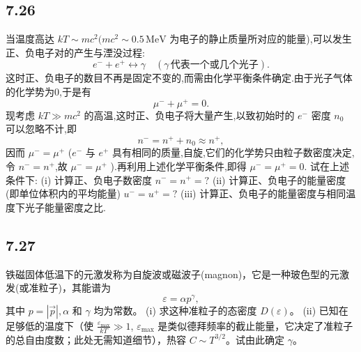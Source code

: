 \newpage
\subsection{7.26}
当温度高达 $kT \sim mc^2 (mc^2 \sim 0.5 \, \text{MeV}$ 为电子的静止质量所对应的能量),可以发生正、负电子对的产生与湮没过程:
$$e^- + e^+ \longleftrightarrow \gamma \quad (\gamma \, \text{代表一个或几个光子}).$$
这时正、负电子的数目不再是固定不变的,而需由化学平衡条件确定.由于光子气体的化学势为0,于是有
$$\mu^- + \mu^+ = 0.$$
现考虑 $kT \gg mc^2$ 的高温,这时正、负电子将大量产生,以致初始时的 $e^-$ 密度 $n_0$ 可以忽略不计,即
$$n^- = n^+ + n_0 \approx n^+,$$
因而 $\mu^- = \mu^+$ ($e^-$ 与 $e^+$ 具有相同的质量,自旋,它们的化学势只由粒子数密度决定,令 $n^- = n^+$,故 $\mu^- = \mu^+$ ).再利用上述化学平衡条件,即得 $\mu^- = \mu^+ = 0.$ 试在上述条件下:
(i) 计算正、负电子数密度 $n^- = n^+ = ?$
(ii) 计算正、负电子的能量密度(即单位体积内的平均能量) $u^- = u^+ = ?$
(iii) 计算正、负电子的能量密度与相同温度下光子能量密度之比.

\newpage
\subsection{7.27}
铁磁固体低温下的元激发称为自旋波或磁波子(magnon)，它是一种玻色型的元激发(或准粒子)，其能谱为
$$\varepsilon = \alpha p^\gamma,$$
其中 $p = |\vec{p}|, \alpha$ 和 $\gamma$ 均为常数。
(i) 求这种准粒子的态密度 $D(\varepsilon)$。
(ii) 已知在足够低的温度下（使 $\frac{\varepsilon_{\max}}{kT} \gg 1$, $\varepsilon_{\max}$ 是类似德拜频率的截止能量，它决定了准粒子的总自由度数；此处无需知道细节），热容 $C \sim T^{3/2}$。试由此确定 $\gamma$。